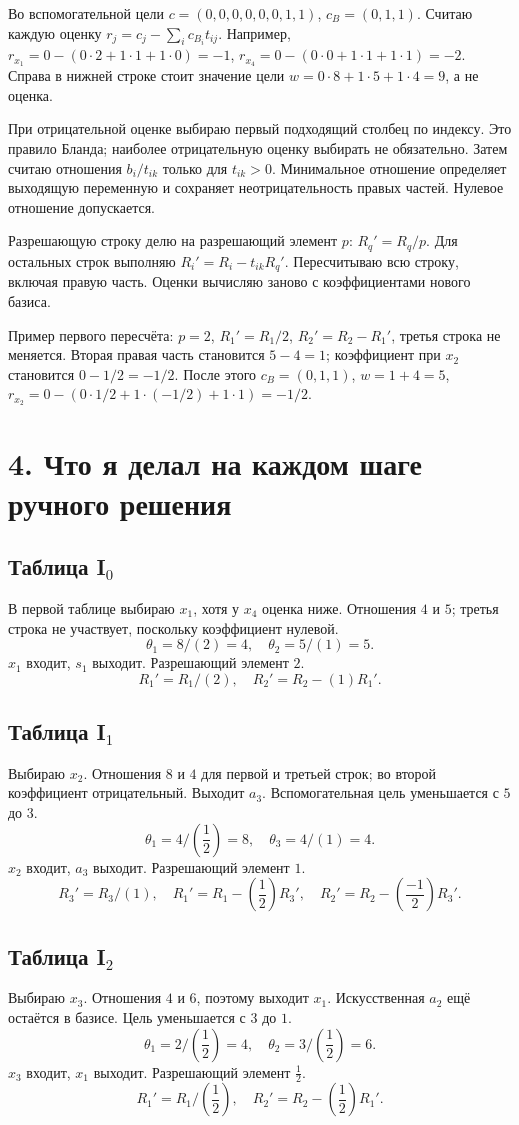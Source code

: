 \documentclass[12pt,a4paper]{article}
\begin{document}
Во вспомогательной цели $c=(0,0,0,0,0,0,1,1)$, $c_B=(0,1,1)$.
Считаю каждую оценку $r_j=c_j-\sum_i c_{B_i}t_{ij}$.
Например, $r_{x_1}=0-(0\cdot2+1\cdot1+1\cdot0)=-1$,
$r_{x_4}=0-(0\cdot0+1\cdot1+1\cdot1)=-2$.
Справа в нижней строке стоит значение цели $w=0\cdot8+1\cdot5+1\cdot4=9$,
а не оценка.

При отрицательной оценке выбираю первый подходящий столбец по индексу.
Это правило Бланда; наиболее отрицательную оценку выбирать не обязательно.
Затем считаю отношения $b_i/t_{ik}$ только для $t_{ik}>0$.
Минимальное отношение определяет выходящую переменную и сохраняет
неотрицательность правых частей. Нулевое отношение допускается.

Разрешающую строку делю на разрешающий элемент $p$:
$R_q'=R_q/p$.
Для остальных строк выполняю $R_i'=R_i-t_{ik}R_q'$.
Пересчитываю всю строку, включая правую часть. Оценки вычисляю заново
с коэффициентами нового базиса.

Пример первого пересчёта: $p=2$, $R_1'=R_1/2$,
$R_2'=R_2-R_1'$, третья строка не меняется.
Вторая правая часть становится $5-4=1$;
коэффициент при $x_2$ становится $0-1/2=-1/2$.
После этого $c_B=(0,1,1)$, $w=1+4=5$,
$r_{x_2}=0-(0\cdot1/2+1\cdot(-1/2)+1\cdot1)=-1/2$.

\section*{4. Что я делал на каждом шаге ручного решения}
\subsection*{Таблица I$_{0}$}
В первой таблице выбираю $x_1$, хотя у $x_4$ оценка ниже. Отношения $4$ и $5$; третья строка не участвует, поскольку коэффициент нулевой.
\[\theta_{1}=8/(2)=4,\quad \theta_{2}=5/(1)=5.\]
$x_{1}$ входит, $s_{1}$ выходит. Разрешающий элемент $2$.
\[R_{1}'=R_{1}/(2),\quad R_{2}'=R_{2}-(1)R_{1}'.\]
\subsection*{Таблица I$_{1}$}
Выбираю $x_2$. Отношения $8$ и $4$ для первой и третьей строк; во второй коэффициент отрицательный. Выходит $a_3$. Вспомогательная цель уменьшается с $5$ до $3$.
\[\theta_{1}=4/(\frac{1}{2})=8,\quad \theta_{3}=4/(1)=4.\]
$x_{2}$ входит, $a_{3}$ выходит. Разрешающий элемент $1$.
\[R_{3}'=R_{3}/(1),\quad R_{1}'=R_{1}-(\frac{1}{2})R_{3}',\quad R_{2}'=R_{2}-(\frac{-1}{2})R_{3}'.\]
\subsection*{Таблица I$_{2}$}
Выбираю $x_3$. Отношения $4$ и $6$, поэтому выходит $x_1$. Искусственная $a_2$ ещё остаётся в базисе. Цель уменьшается с $3$ до $1$.
\[\theta_{1}=2/(\frac{1}{2})=4,\quad \theta_{2}=3/(\frac{1}{2})=6.\]
$x_{3}$ входит, $x_{1}$ выходит. Разрешающий элемент $\frac{1}{2}$.
\[R_{1}'=R_{1}/(\frac{1}{2}),\quad R_{2}'=R_{2}-(\frac{1}{2})R_{1}'.\]
\end{document}
